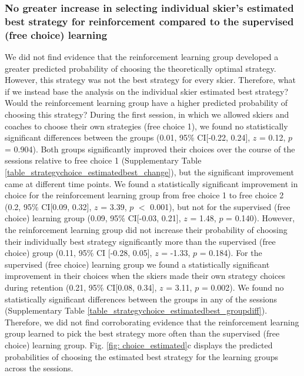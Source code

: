 \documentclass[pdflatex,sn-nature]{sn-jnl}%
\theoremstyle{thmstyleone}%
\theoremstyle{thmstyletwo}%
\theoremstyle{thmstylethree}%
\begin{document}
\subsubsection{No greater increase in selecting individual skier's estimated best strategy for reinforcement compared to the supervised (free choice) learning}\label{result_strategychoice_individual}
We did not find evidence that the reinforcement learning group developed a greater predicted probability of choosing the theoretically optimal strategy. However, this strategy was not the best strategy for every skier. Therefore, what if we instead base the analysis on the individual skier estimated best strategy? Would the reinforcement learning group have a higher predicted probability of choosing this strategy? During the first session, in which we allowed skiers and coaches to choose their own strategies (free choice 1),  we found no statistically significant differences between the groups (0.01, 95\% CI[-0.22, 0.24], $z$ = 0.12, $p$ = 0.904). Both groups significantly improved their choices over the course of the sessions relative to free choice 1 (Supplementary Table \ref{table_strategychoice_estimatedbest_change}), but the significant improvement came at different time points. We found a statistically significant improvement in choice for the reinforcement learning group from free choice 1 to free choice 2 (0.2, 95\% CI[0.09, 0.32], $z$ = 3.39, $p$ $<$ 0.001), but not for the supervised (free choice) learning group (0.09, 95\% CI[-0.03, 0.21], $z$ = 1.48, $p$ = 0.140). However, the reinforcement learning group did not increase their probability of choosing their individually best strategy significantly more than the supervised (free choice) group (0.11, 95\% CI [-0.28, 0.05], $z$ = -1.33, $p$ = 0.184). For the supervised (free choice) learning group we found a statistically significant improvement in their choices when the skiers made their own strategy choices during retention (0.21, 95\% CI[0.08, 0.34], $z$ = 3.11, $p$  =  0.002). We found no statistically significant differences between the groups in any of the sessions (Supplementary Table \ref{table_strategychoice_estimatedbest_groupdiff}). Therefore, we did not find corroborating evidence that the reinforcement learning group learned to pick the best strategy more often than the supervised (free choice) learning group. Fig. \ref{fig: choice_estimated}c displays the predicted probabilities of choosing the estimated best strategy for the learning groups across the sessions.
\end{document}
